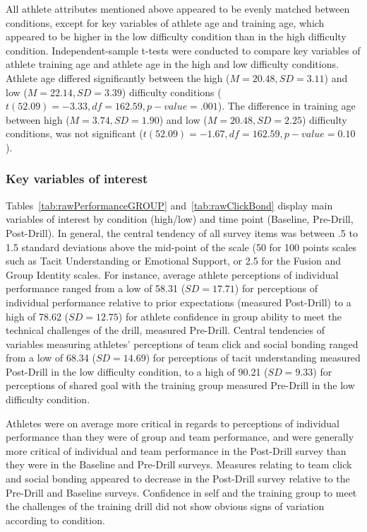 \begin{CJK}{UTF8}{gbsn}
All athlete attributes mentioned above appeared to be evenly matched between conditions, except for key variables of athlete age and training age, which appeared to be higher in the low difficulty condition than in the high difficulty condition. Independent-sample t-tests were conducted to compare key variables of athlete training age and athlete age in the high and low difficulty conditions. Athlete age differed significantly between the high ($M= 20.48, SD =3.11$) and low ($M= 22.14, SD =3.39$) difficulty conditions ($t(52.09) = -3.33, df = 162.59, p-value = .001$).  The difference in training age between high ($M= 3.74, SD =1.90$) and low ($M= 20.48, SD =2.25$) difficulty conditions, was not significant ($t(52.09)= -1.67, df = 162.59, p-value = 0.10$).




\subsubsection{Key variables of interest \label{sect:surveyResponses}}
Tables~\ref{tab:rawPerformanceGROUP} and~\ref{tab:rawClickBond} display main variables of interest by condition (high/low) and time point (Baseline, Pre-Drill, Post-Drill).  In general, the central tendency of all survey items was between .5 to 1.5 standard deviations above the mid-point of the scale (50 for 100 points scales such as Tacit Understanding or Emotional Support, or 2.5 for the Fusion and Group Identity scales.   For instance, average athlete perceptions of individual performance ranged from a low of 58.31 ($SD = 17.71$) for perceptions of individual performance relative to prior expectations (measured Post-Drill) to a high of 78.62 ($SD = 12.75$) for athlete confidence in group ability to meet the technical challenges of the drill, measured Pre-Drill.  Central tendencies of variables measuring athletes' perceptions of team click and social bonding ranged from a low of 68.34 ($SD = 14.69$) for perceptions of tacit understanding measured Post-Drill in the low difficulty condition, to a high of 90.21 ($SD = 9.33$) for perceptions of shared goal with the training group measured Pre-Drill in the low difficulty condition.

Athletes were on average more critical in regards to perceptions of individual performance than they were of group and team performance, and were generally more critical of individual and team performance in the Post-Drill survey than they were in the Baseline and Pre-Drill surveys.  Measures relating to team click and social bonding appeared to decrease in the Post-Drill survey relative to the Pre-Drill and Baseline surveys. Confidence in self and the training group to meet the challenges of the training drill did not show obvious signs of variation according to condition.


\end{CJK}
